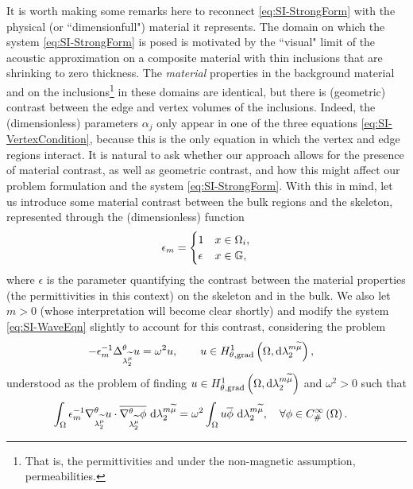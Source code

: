 It is worth making some remarks here to reconnect \eqref{eq:SI-StrongForm} with the physical (or ``dimensionfull") material it represents.
The domain on which the system \eqref{eq:SI-StrongForm} is posed is motivated by the ``visual" limit of the acoustic approximation on a composite material with thin inclusions that are shrinking to zero thickness.
The \emph{material} properties in the background material and on the inclusions\footnote{That is, the permittivities and under the non-magnetic assumption, permeabilities.} in these domains are identical, but there is (geometric) contrast between the edge and vertex volumes of the inclusions.
Indeed, the (dimensionless) parameters $\alpha_j$ only appear in one of the three equations \eqref{eq:SI-VertexCondition}, because this is the only equation in which the vertex and edge regions interact.
It is natural to ask whether our approach allows for the presence of material contrast, as well as geometric contrast, and how this might affect our problem formulation and the system \eqref{eq:SI-StrongForm}.
With this in mind, let us introduce some material contrast between the bulk regions and the skeleton, represented through the (dimensionless) function
\begin{align*}
	\epsilon_m =
	\begin{cases} 1 & x\in\Omega_i, \\ \epsilon & x\in\mathbb{G}, \end{cases}
\end{align*}
where $\epsilon$ is the parameter quantifying the contrast between the material properties (the permittivities in this context) on the skeleton and in the bulk.
We also let $m>0$ (whose interpretation will become clear shortly) and modify the system \eqref{eq:SI-WaveEqn} slightly to account for this contrast, considering the problem
\begin{align*}
	-\epsilon_m^{-1}\Delta_{\lambda_2^{\widetilde{\mu}}}^{\theta} u &= \omega^2 u,
	\qquad u\in H^1_{\theta, \mathrm{grad}}\left( \Omega, \mathrm{d}\lambda_2^{m\widetilde{\mu}} \right),
\end{align*}
understood as the problem of finding $u\in H^1_{\theta, \mathrm{grad}}\left( \Omega, \mathrm{d}\lambda_2^{m\widetilde{\mu}} \right)$ and $\omega^2>0$ such that
\begin{align} \label{eq:SI-ContrastWeakWaveEqn}
	\int_{\Omega} \epsilon_m^{-1}\nabla^{\theta}_{\lambda_2^{\widetilde{\mu}}}u\cdot\overline{\nabla^{\theta}_{\lambda_2^{\widetilde{\mu}}}\phi}  \ \mathrm{d}\lambda_2^{m\widetilde{\mu}}
	&= \omega^2 \int_{\Omega} u\overline{\phi}  \ \mathrm{d}\lambda_2^{m\widetilde{\mu}}, \quad\forall\phi\in C^{\infty}_{\#}\left( \Omega \right).
\end{align}
